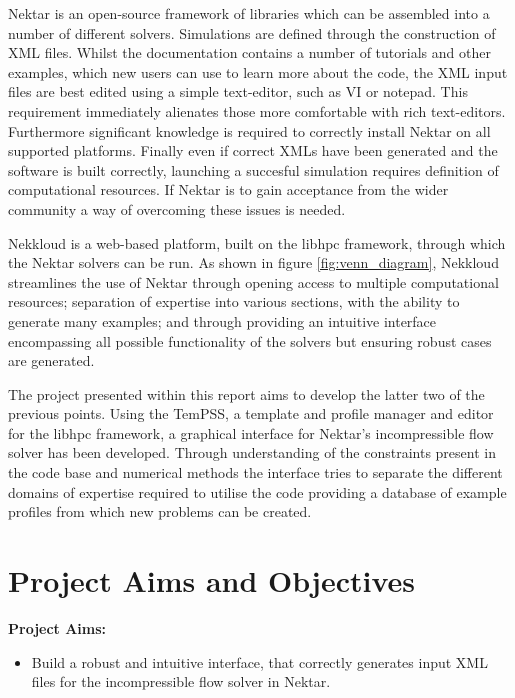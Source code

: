 \documentclass[11pt, a4paper]{report}
\begin{document}
Nektar\cite{Nektar2015} is an open-source framework of libraries which can be assembled into a number of different solvers. Simulations are defined through the construction of XML\cite{Solo_etal2002} files. Whilst the documentation contains a number of tutorials and other examples, which new users can use to learn more about the code, the XML input files are best edited using a simple text-editor, such as VI or notepad. This requirement immediately alienates those more comfortable with rich text-editors. Furthermore significant knowledge is required to correctly install Nektar on all supported platforms. Finally even if correct XMLs have been generated and the software is built correctly, launching a succesful simulation requires definition of computational resources. If Nektar is to gain acceptance from the wider community a way of overcoming these issues is needed.

Nekkloud\cite{Cohen_etal2013} is a web-based platform, built on the libhpc framework, through which the Nektar solvers can be run. As shown in figure \ref{fig:venn_diagram}, Nekkloud streamlines the use of Nektar through opening access to multiple computational resources; separation of expertise into various sections, with the ability to generate many examples; and through providing an intuitive interface encompassing all possible functionality of the solvers but ensuring robust cases are generated.

The project presented within this report aims to develop the latter two of the previous points. Using the TemPSS\cite{Austing_etal2017}, a template and profile manager and editor for the libhpc framework, a graphical interface for Nektar's incompressible flow solver has been developed. Through understanding of the constraints present in the code base and numerical methods the interface tries to separate the different domains of expertise required to utilise the code providing a database of example profiles from which new problems can be created.
\newpage

\chapter{Project Aims and Objectives}
\label{chap:proj_spec}
\textbf{Project Aims:}
\begin{itemize}
\item Build a robust and intuitive interface, that correctly generates input XML files for the incompressible flow solver in Nektar.
\end{itemize}
\end{document}
